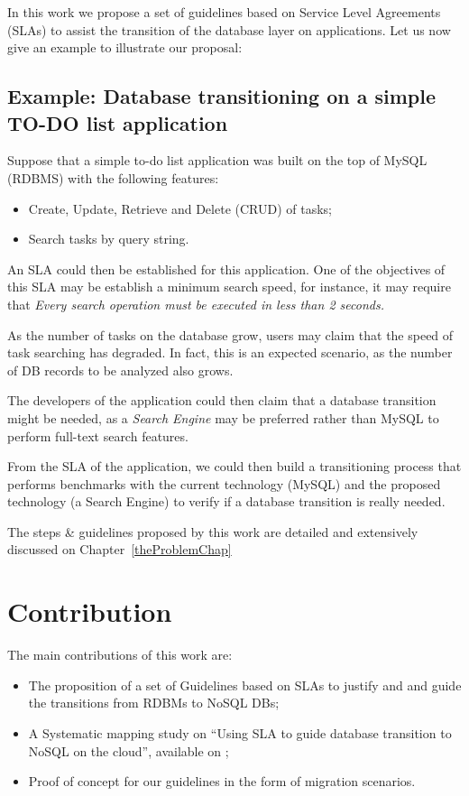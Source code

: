 In this work we propose a set of guidelines based on Service Level Agreements (SLAs) to assist the transition of the database layer on applications. Let us now give an example to illustrate our proposal:

\subsection{Example: Database transitioning on a simple TO-DO list application}

Suppose that a simple to-do list application was built on the top of MySQL (RDBMS) with the following features:

\begin{itemize}
   \item{Create, Update, Retrieve and Delete (CRUD) of tasks;}
   \item{Search tasks by query string.}
\end{itemize}

An SLA could then be established for this application. One of the objectives of this SLA may be establish a minimum search speed, for instance, it may require that \textit{Every search operation must be executed in less than 2 seconds.}

As the number of tasks on the database grow, users may claim that the speed of task searching has degraded. In fact, this is an expected scenario, as the number of DB records to be analyzed also grows.

The developers of the application could then claim that a database transition might be needed, as a \textit{Search Engine} may be preferred rather than MySQL to perform full-text search features. 

From the SLA of the application, we could then build a transitioning process that performs benchmarks with the current technology (MySQL) and the proposed technology (a Search Engine) to verify if a database transition is really needed.

The steps \& guidelines proposed by this work are detailed and extensively discussed on Chapter~\ref{theProblemChap}

\section{Contribution}

The main contributions of this work are: 

\begin{itemize}
   \item{The proposition of a set of Guidelines based on SLAs to justify and and guide the transitions from RDBMs to NoSQL DBs;}
   \item{A Systematic mapping study on ``Using SLA to guide database transition to NoSQL on the cloud'', available on \cite{fabioMartinSM};}
   \item{Proof of concept for our guidelines in the form of migration scenarios.}
\end{itemize}

